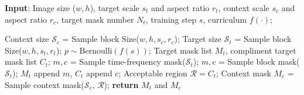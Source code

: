 \documentclass{article}
\begin{document}
\begin{algorithm}[t]
\caption{\small
{Curriculum Masking Strategy}}\label{algorithm}
\textbf{Input}: Image size ($w, h$), target scale $s_t$ and aspect ratio $r_t$, context scale $s_c$ and aspect ratio $r_c$, target mask number $N_t$, training step $s$, curriculum $f(\cdot)$; 
\begin{algorithmic}[1]
\STATE Context size $\mathcal{S}_c$ = Sample block Size($w, h, s_c, r_c$);
\STATE Target size $\mathcal{S}_t$ = Sample block Size($w, h, s_t, r_t$); 
\STATE $p \sim  \text{Bernoulli}(f(s))$;
\STATE Target mask list $M_t$, compliment target mask list $C_t$;
        \STATE $m, c$ = Sample time-frequency mask($\mathcal{S}_t$);
    \ELSE
        \STATE $m, c$ = Sample block mask($\mathcal{S}_t$);
    \ENDIF 
    \STATE $M_t$ append $m$, $C_t$ append $c$;
\ENDFOR
\STATE Acceptable region $\mathcal{R} = C_t$;
\STATE Context mask $M_c$ = Sample context mask($\mathcal{S}_c$, $\mathcal{R}$);
\STATE \textbf{return} $M_t$ and $M_c$
    \end{algorithmic}
\end{algorithm}
\end{document}
